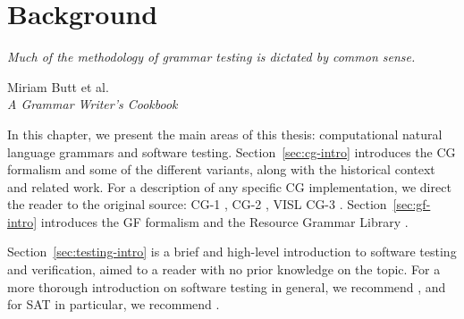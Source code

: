 \chapter{Background}

\epigraph{\it Much of the methodology of grammar testing is dictated by common sense.}{Miriam Butt et al.\\{\it A Grammar Writer's Cookbook}}

In this chapter, we present the main areas of this thesis: computational natural language grammars and software testing.
Section~\ref{sec:cg-intro} introduces the CG formalism and some of the different variants, along with the historical context and related work.
For a description of any specific CG implementation, we direct the reader to the original source: CG-1 \cite{karlsson1990cgp,karlsson1995constraint}, CG-2 \cite{tapanainen1996}, VISL CG-3 \cite{bick2015,vislcg3}.
Section~\ref{sec:gf-intro} introduces the GF formalism \cite{ranta2011gfbook} and the Resource Grammar Library \cite{ranta2009rgl}.

Section~\ref{sec:testing-intro} is a brief and high-level introduction to software testing and verification, aimed to a reader with no prior knowledge on the topic. For a more thorough introduction on software testing in general, we recommend , and for SAT in particular, we recommend \cite{biere2009handbook}.










